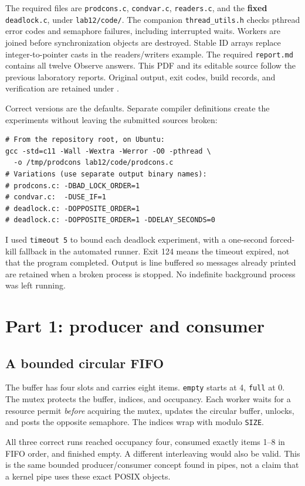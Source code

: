 \documentclass[12pt]{article}
\begin{document}
The required files are \texttt{prodcons.c}, \texttt{condvar.c},
\texttt{readers.c}, and the \textbf{fixed} \texttt{deadlock.c}, under
\texttt{lab12/code/}. The companion \texttt{thread\_utils.h} checks pthread
error codes and semaphore failures, including interrupted waits. Workers
are joined before synchronization objects are destroyed. Stable ID arrays
replace integer-to-pointer casts in the readers/writers example.
The required \texttt{report.md} contains all twelve Observe answers.
This PDF and its editable source follow the previous laboratory reports.
Original output, exit codes, build records, and verification are retained
under .

Correct versions are the defaults. Separate compiler definitions create
the experiments without leaving the submitted sources broken:
\begin{lstlisting}
# From the repository root, on Ubuntu:
gcc -std=c11 -Wall -Wextra -Werror -O0 -pthread \
  -o /tmp/prodcons lab12/code/prodcons.c
# Variations (use separate output binary names):
# prodcons.c: -DBAD_LOCK_ORDER=1
# condvar.c:  -DUSE_IF=1
# deadlock.c: -DOPPOSITE_ORDER=1
# deadlock.c: -DOPPOSITE_ORDER=1 -DDELAY_SECONDS=0
\end{lstlisting}
I used \texttt{timeout 5} to bound each deadlock experiment, with a
one-second forced-kill fallback in the automated runner. Exit 124 means
the timeout expired, not that the program completed. Output is line
buffered so messages already printed are retained when a broken process
is stopped. No indefinite background process was left running.

\clearpage
\section{Part 1: producer and consumer}
\subsection{A bounded circular FIFO}
The buffer has four slots and carries eight items. \texttt{empty} starts
at 4, \texttt{full} at 0. The mutex protects the buffer, indices, and
occupancy. Each worker waits for a resource permit \emph{before} acquiring
the mutex, updates the circular buffer, unlocks, and posts the opposite
semaphore. The indices wrap with modulo \texttt{SIZE}.

All three correct runs reached occupancy four, consumed exactly items
1--8 in FIFO order, and finished empty. A different interleaving would
also be valid. This is the same bounded producer/consumer concept found
in pipes, not a claim that a kernel pipe uses these exact POSIX objects.
\end{document}
